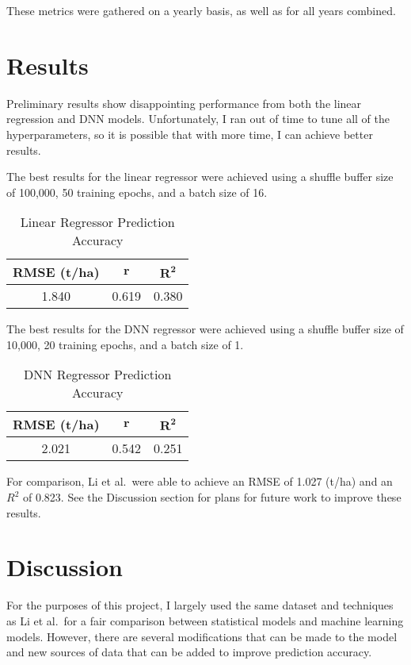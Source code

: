 \documentclass[letterpaper]{article}
\begin{document}
These metrics were gathered on a yearly basis, as well as for all years combined.

\section{Results}

Preliminary results show disappointing performance from both the linear regression and DNN models. Unfortunately, I ran out of time to tune all of the hyperparameters, so it is possible that with more time, I can achieve better results.

The best results for the linear regressor were achieved using a shuffle buffer size of 100,000, 50 training epochs, and a batch size of 16.

\begin{table}[h!]
    \centering
    \caption{Linear Regressor Prediction Accuracy}
    \begin{tabular}{|c|c|c|}
        \hline
        \textbf{RMSE (t/ha)} & $\mathbf{r}$ & $\mathbf{R^2}$ \\
        \hline
        1.840 & 0.619 & 0.380 \\
        \hline
    \end{tabular}
\end{table}

The best results for the DNN regressor were achieved using a shuffle buffer size of 10,000, 20 training epochs, and a batch size of 1.

\begin{table}[h!]
    \centering
    \caption{DNN Regressor Prediction Accuracy}
    \begin{tabular}{|c|c|c|}
        \hline
        \textbf{RMSE (t/ha)} & $\mathbf{r}$ & $\mathbf{R^2}$ \\
        \hline
        2.021 & 0.542 & 0.251 \\
        \hline
    \end{tabular}
\end{table}

For comparison, Li et al.\ were able to achieve an RMSE of 1.027 (t/ha) and an $R^2$ of 0.823. See the Discussion section for plans for future work to improve these results.

\section{Discussion}

For the purposes of this project, I largely used the same dataset and techniques as Li et al.\ for a fair comparison between statistical models and machine learning models. However, there are several modifications that can be made to the model and new sources of data that can be added to improve prediction accuracy.
\end{document}

